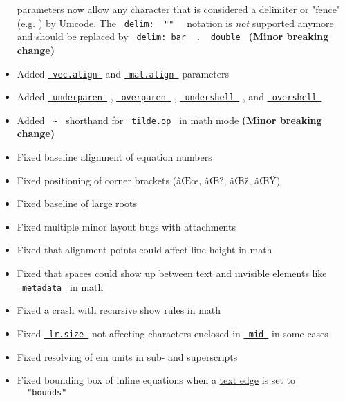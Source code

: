 \begin{itemize}
  parameters now allow any character that is considered a delimiter or
  "fence" (e.g. \textbar) by Unicode. The
  \texttt{\ delim:\ }{\texttt{\ "\textbar{}\textbar{}"\ }}\texttt{\ }
  notation is \emph{not} supported anymore and should be replaced by
  \texttt{\ delim:\ bar\ }{\texttt{\ .\ }}\texttt{\ double\ }
  \textbf{(Minor breaking change)}
\item
  Added
  \href{/docs/reference/math/vec/\#parameters-align}{\texttt{\ vec.align\ }}
  and
  \href{/docs/reference/math/mat/\#parameters-align}{\texttt{\ mat.align\ }}
  parameters
\item
  Added
  \href{/docs/reference/math/underover/\#functions-underparen}{\texttt{\ underparen\ }}
  ,
  \href{/docs/reference/math/underover/\#functions-overparen}{\texttt{\ overparen\ }}
  ,
  \href{/docs/reference/math/underover/\#functions-undershell}{\texttt{\ undershell\ }}
  , and
  \href{/docs/reference/math/underover/\#functions-overshell}{\texttt{\ overshell\ }}
\item
  Added \texttt{\ \textasciitilde{}\ } shorthand for
  \texttt{\ tilde.op\ } in math mode \textbf{(Minor breaking change)}
\item
  Fixed baseline alignment of equation numbers
\item
  Fixed positioning of corner brackets (âŒœ, âŒ?, âŒž, âŒŸ)
\item
  Fixed baseline of large roots
\item
  Fixed multiple minor layout bugs with attachments
\item
  Fixed that alignment points could affect line height in math
\item
  Fixed that spaces could show up between text and invisible elements
  like
  \href{/docs/reference/introspection/metadata/}{\texttt{\ metadata\ }}
  in math
\item
  Fixed a crash with recursive show rules in math
\item
  Fixed
  \href{/docs/reference/math/lr/\#functions-lr-size}{\texttt{\ lr.size\ }}
  not affecting characters enclosed in
  \href{/docs/reference/math/lr/\#functions-mid}{\texttt{\ mid\ }} in
  some cases
\item
  Fixed resolving of em units in sub- and superscripts
\item
  Fixed bounding box of inline equations when a
  \href{/docs/reference/text/text/\#parameters-top-edge}{text edge} is
  set to \texttt{\ }{\texttt{\ "bounds"\ }}\texttt{\ }
\end{itemize}

